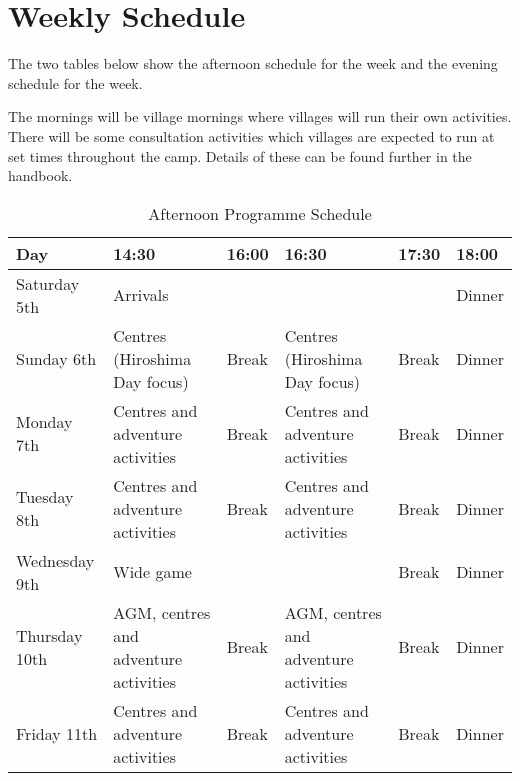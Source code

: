 \documentclass[a4paper, 11pt]{report}
\begin{document}
\section{Weekly Schedule}
The two tables below show the afternoon schedule for the week and the evening schedule for the week.\nl

The mornings will be village mornings where villages will run their own activities. There will be some consultation activities which villages are expected to run at set times throughout the camp. Details of these can be found further in the handbook. 
\begin{table}[H]
    \centering
    {\RaggedRight
    \begin{tabular}{p{} p{} p{} p{} p{} p{}}
        \textbf{Day} & \textbf{14:30} & \textbf{16:00} & \textbf{16:30} & \textbf{17:30} & \textbf{18:00} \\
        \hline
        Saturday 5th & \multicolumn{4}{l}{Arrivals} & Dinner \\
        \hline
        Sunday 6th & Centres (Hiroshima Day focus) & Break & Centres (Hiroshima Day focus) & Break & Dinner \\
        \hline
        Monday 7th & Centres and adventure activities & Break & Centres and adventure activities & Break & Dinner \\
        \hline
        Tuesday 8th & Centres and adventure activities & Break & Centres and adventure activities & Break & Dinner \\
        \hline
        Wednesday 9th & \multicolumn{3}{l}{Wide game} & Break & Dinner \\
        \hline
        Thursday 10th & AGM, centres and adventure activities & Break & AGM, centres and adventure activities & Break & Dinner \\
        \hline 
        Friday 11th & Centres and adventure activities & Break & Centres and adventure activities & Break & Dinner\\
        \hline
    \end{tabular}
    }%
    \caption{Afternoon Programme Schedule}
\end{table}
\end{document}
